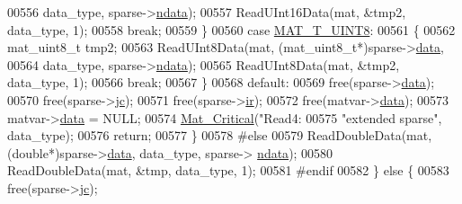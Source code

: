 \begin{DoxyCode}
{{00556                                     data\_type, sparse->\hyperlink{group___m_a_t_a1beb8a8c58a808207cbea650563a9b63}{ndata});
00557                                 ReadUInt16Data(mat, &tmp2, data\_type, 1);
00558                                 \textcolor{keywordflow}{break};
00559                             \}
00560                             \textcolor{keywordflow}{case} \hyperlink{group___m_a_t_ggacf7b3b879282b7ab3a51190e49bf3453a01c1bd7db68f90552862eb5d311be408}{MAT\_T\_UINT8}:
00561                             \{
00562                                 mat\_uint8\_t tmp2;
00563                                 ReadUInt8Data(mat, (mat\_uint8\_t*)sparse->\hyperlink{group___m_a_t_ae2c648cb9eac4ce47f26cddb44246152}{data},
00564                                     data\_type, sparse->\hyperlink{group___m_a_t_a1beb8a8c58a808207cbea650563a9b63}{ndata});
00565                                 ReadUInt8Data(mat, &tmp2, data\_type, 1);
00566                                 \textcolor{keywordflow}{break};
00567                             \}
00568                             \textcolor{keywordflow}{default}:
00569                                 free(sparse->\hyperlink{group___m_a_t_ae2c648cb9eac4ce47f26cddb44246152}{data});
00570                                 free(sparse->\hyperlink{group___m_a_t_ad1e74cdc4f7eff1e47a670297c01da4b}{jc});
00571                                 free(sparse->\hyperlink{group___m_a_t_a8d4c863d704edddec5cbfa15b2d719c8}{ir});
00572                                 free(matvar->\hyperlink{group___m_a_t_a5672978efa230bbdecdf38ede781f7fa}{data});
00573                                 matvar->\hyperlink{group___m_a_t_a5672978efa230bbdecdf38ede781f7fa}{data} = NULL;
00574                                 \hyperlink{group__mat__util_gaf51f2bfbb5580f575e4dd79757e2b80c}{Mat\_Critical}(\textcolor{stringliteral}{"Read4: %
00575                                     \textcolor{stringliteral}{"extended sparse"}, data\_type);
00576                                 \textcolor{keywordflow}{return};
00577                         \}
00578 \textcolor{preprocessor}{#else}
00579                         ReadDoubleData(mat, (\textcolor{keywordtype}{double}*)sparse->\hyperlink{group___m_a_t_ae2c648cb9eac4ce47f26cddb44246152}{data}, data\_type, sparse->
      \hyperlink{group___m_a_t_a1beb8a8c58a808207cbea650563a9b63}{ndata});
00580                         ReadDoubleData(mat, &tmp, data\_type, 1);
00581 \textcolor{preprocessor}{#endif}
00582                     \} \textcolor{keywordflow}{else} \{
00583                         free(sparse->\hyperlink{group___m_a_t_ad1e74cdc4f7eff1e47a670297c01da4b}{jc});
}}}
\end{DoxyCode}
